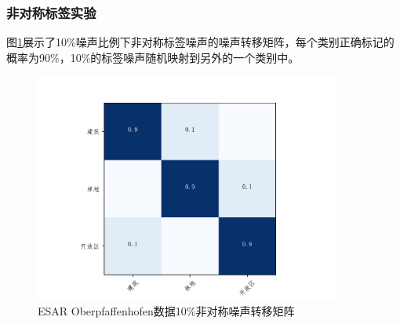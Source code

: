 \subsubsection{非对称标签实验}
图\ref{fig:ober_noise_random}展示了10\%噪声比例下非对称标签噪声的噪声转移矩阵，每个类别正确标记的概率为90\%，10\%的标签噪声随机映射到另外的一个类别中。
\begin{figure}[ht!]
  \centering
  \includegraphics[width=10.04cm]{pic/chapter4/ober/noise_random.pdf}
  \caption{ESAR Oberpfaffenhofen数据10\%非对称噪声转移矩阵}
  \label{fig:ober_noise_random}
\end{figure}

